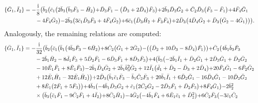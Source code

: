 \documentclass[10pt]{amsart}
\theoremstyle{definition}
\theoremstyle{corollary}
\theoremstyle{remark}
\theoremstyle{conclusion}
\begin{document}
\begin{align}
    \{\bar{G}_1, \bar{I}_2\} & =-\frac{{\rm i}}{8}  \bigl(\bar{b}_2 \bigl(\bar{c}_1 \bigl(2 \bar{b}_3 \bigl(\bar{b}_3 \bar{F}_3-\bar{H}_2\bigl)+\bar{D}_3 \bar{F}_1-\bigl(\bar{D}_3+2 \bar{D}_4\bigl) \bar{F}_3\bigl)+2 \bar{b}_3 \bar{D}_3 \bar{G}_2+\bar{C}_2 \bar{D}_3 \bigl(\bar{F}_3-\bar{F}_1\bigl)+4 \bar{F}_4 \bar{G}_1 \nonumber \\
& \hskip 0.7cm-4 \bar{F}_4 \bar{G}_2\bigl)-2 \bar{b}_3 \bigl(3 \bar{c}_1 \bar{D}_3 \bar{F}_3+4 \bar{F}_4 \bar{G}_2\bigl)+6 \bar{c}_1 \bigl(\bar{D}_3 \bar{H}_2+\bar{F}_3 \bar{F}_4\bigl)+2 \bar{D}_3 \bigl(4 \bar{D}_4 \bar{G}_2+\bar{D}_3 \bigl(\bar{G}_2-4 \bar{G}_1\bigl)\bigl)\bigl).
\end{align}
  Analogously, the remaining relations are computed: 
\begin{align}
\{\bar{G}_1, \bar{I}_1\}&=-\frac{{\rm i}}{32} \bigl(\bar{b}_2 \bigl(\bar{c}_1 \bigl(\bar{b}_1 \bigl(4 \bar{b}_3 \bar{F}_3-6 \bar{H}_2\bigl)+8 \bar{C}_2 \bigl(\bar{G}_1+2 \bar{G}_2\bigl)-\bigl(\bigl(\bar{D}_2+10 \bar{D}_3-8 \bar{D}_4\bigl) \bar{F}_1\bigl)\bigl)+\bar{C}_2 \bigl(4 \bar{b}_1 \bar{b}_3 \bar{F}_3 \nonumber \\
& \hskip 0.7cm-2 \bar{b}_1 \bar{H}_2-8 \bar{d}_1 \bar{F}_3+5 \bar{D}_2 \bar{F}_1-6 \bar{D}_3 \bar{F}_1+8 \bar{D}_3 \bar{F}_3\bigl)+4 \bigl(\bar{b}_3 \bigl(-2 \bar{b}_1 \bar{I}_1+\bar{D}_2 \bar{G}_1+2 \bar{D}_3 \bar{G}_1+\bar{D}_2 \bar{G}_2 \nonumber \\
& \hskip 0.7cm-10 \bar{E}_1 \bar{F}_1+8 \bar{E}_1 \bar{F}_3\bigl)-2 \bar{b}_1 \bar{D}_4 \bar{G}_2+2 \bar{b}_1 \bar{b}_3^2 \bar{G}_2+12 \bar{I}_1 \bigl(\bar{d}_1+\bar{D}_2-\bar{D}_3+2 \bar{D}_4\bigl)+20 \bar{F}_4 \bar{G}_1-6 \bar{F}_2 \bar{G}_2 \nonumber \\
& \hskip 0.7cm+12 \bar{E}_1 \bar{H}_1-32 \bar{E}_1 \bar{H}_2\bigl)\bigl)+2 \bar{D}_3 \bigl(\bar{b}_1 \bar{c}_1 \bar{F}_3-\bar{b}_1 \bar{C}_2 \bar{F}_3+20 \bar{b}_1 \bar{I}_1+6 \bar{D}_2 \bar{G}_1-16 \bar{D}_4 \bar{G}_1-10 \bar{D}_2 \bar{G}_2 \nonumber \\
& \hskip 0.7cm+8 \bar{E}_1 \bigl(2 \bar{F}_1+5 \bar{F}_3\bigl)\bigl)+4 \bar{b}_3 \bigl(-4 \bar{b}_1 \bar{D}_3 \bar{G}_2+\bar{c}_1 \bigl(2 \bar{C}_2 \bar{G}_2-2 \bar{D}_3 \bar{F}_1+\bar{D}_2 \bar{F}_3\bigl)+8 \bar{F}_4 \bar{G}_1\bigl)-2 \bar{b}_2^2 \nonumber \\
& \hskip 0.7cm \times \bigl(\bar{b}_3 \bigl(\bar{c}_1 \bar{F}_1-9 \bar{C}_2 \bar{F}_1+4 \bar{I}_2\bigl)+8 \bar{C}_2 \bar{H}_1\bigl)-4 \bar{G}_2 \bigl(-4 \bar{b}_1 \bar{F}_4+6 \bar{E}_1 \bar{c}_1+\bar{D}_2^2\bigl)+6 \bar{C}_2 \bar{F}_3 \bigl(-3 \bar{c}_1 \bar{C}_2 \nonumber \\

\end{align}
\end{document}
